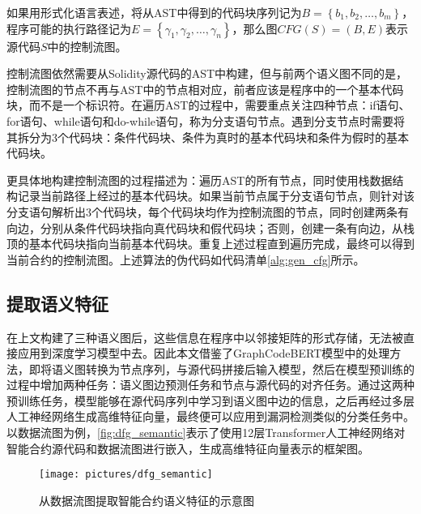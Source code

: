 如果用形式化语言表述，将从AST中得到的代码块序列记为$B=\left\{b_1, b_2,\ldots, b_m\right\}$，程序可能的执行路径记为$E=\left\{\gamma_1, \gamma_2, \ldots, \gamma_n\right\}$，那么图$CFG(S)=(B, E)$表示源代码$S$中的控制流图。





控制流图依然需要从Solidity源代码的AST中构建，但与前两个语义图不同的是，控制流图的节点不再与AST中的节点相对应，前者应该是程序中的一个基本代码块，而不是一个标识符。在遍历AST的过程中，需要重点关注四种节点：if语句、for语句、while语句和do-while语句，称为分支语句节点。遇到分支节点时需要将其拆分为3个代码块：条件代码块、条件为真时的基本代码块和条件为假时的基本代码块。

更具体地构建控制流图的过程描述为：遍历AST的所有节点，同时使用栈数据结构记录当前路径上经过的基本代码块。如果当前节点属于分支语句节点，则针对该分支语句解析出3个代码块，每个代码块均作为控制流图的节点，同时创建两条有向边，分别从条件代码块指向真代码块和假代码块；否则，创建一条有向边，从栈顶的基本代码块指向当前基本代码块。重复上述过程直到遍历完成，最终可以得到当前合约的控制流图。上述算法的伪代码如代码清单\autoref{alg:gen_cfg}所示。

\subsection{提取语义特征}
在上文构建了三种语义图后，这些信息在程序中以邻接矩阵的形式存储，无法被直接应用到深度学习模型中去。因此本文借鉴了GraphCodeBERT模型\cite{guo2020graphcodebert}中的处理方法，即将语义图转换为节点序列，与源代码拼接后输入模型，然后在模型预训练的过程中增加两种任务：语义图边预测任务和节点与源代码的对齐任务。通过这两种预训练任务，模型能够在源代码序列中学习到语义图中边的信息，之后再经过多层人工神经网络生成高维特征向量，最终便可以应用到漏洞检测类似的分类任务中。
以数据流图为例，\autoref{fig:dfg_semantic}表示了使用12层Transformer人工神经网络对智能合约源代码和数据流图进行嵌入，生成高维特征向量表示的框架图。
\begin{figure}[htbp]
    \centering
    \texttt{[image: pictures/dfg\_semantic]}
    \caption{\label{fig:dfg_semantic}从数据流图提取智能合约语义特征的示意图}
\end{figure}




